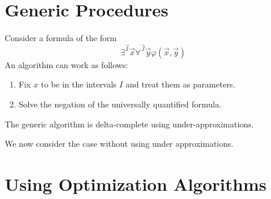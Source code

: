 \documentclass{llncs}
\begin{document}
\section{Generic Procedures}
Consider a formula of the form 
$$\exists^{\vec I} \vec x \forall^{\vec J} \vec y \varphi(\vec x, \vec y)$$
An algorithm can work as follows:
\begin{enumerate}
\item Fix $x$ to be in the intervals $I$ and treat them as parameters. 
\item Solve the negation of the universally quantified formula. 
\end{enumerate}

\begin{definition}[Underapproximation]

\end{definition}

\begin{theorem}
The generic algorithm is delta-complete using under-approximations. 
\end{theorem}

We now consider the case without using under approximations. 




\section{Using Optimization Algorithms}
\end{document}

